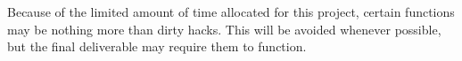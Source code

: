 Because of the limited amount of time allocated
for this project, certain functions may be nothing
more than dirty hacks. This will be avoided whenever
possible, but the final deliverable may require them
to function.

\begin{comment}
The ultimate goal is to fully support OpenCL on the PS3. 
However, this may not be possible in the limited
5 week time frame.
\end{comment}
